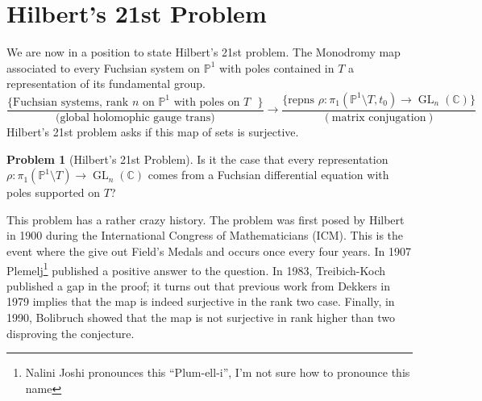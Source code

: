 \documentclass[12pt]{book}
\numberwithin{equation}{section}
\theoremstyle{definition}
\newtheorem{problem}[theorem]{Problem}
\theoremstyle{remark}
\newcommand{\CC}{\mathbb{C}}
\newcommand{\PP}{\mathbb{P}}
\newcommand{\GL}{\operatorname{GL}}
\begin{document}
\section{Hilbert's 21st Problem}
We are now in a position to state Hilbert's 21st problem. 
The Monodromy map associated to every Fuchsian system on $\PP^1$ with poles contained in $T$ a representation of its fundamental group. 
$$ \frac{\lbrace \mbox{Fuchsian systems, rank $n$ on $\PP^1$ 
		with poles on $T$ } \rbrace}{\mbox{(global holomophic gauge trans)}} \to\frac{\lbrace \mbox{repns $\rho:\pi_1(\PP^1\setminus T, t_0) \to \GL_n(\CC) $}\rbrace}{(\mbox{matrix conjugation})} $$
Hilbert's 21st problem asks if this map of sets is surjective. 
\begin{problem}[Hilbert's 21st Problem]
	Is it the case that every representation $\rho:\pi_1(\PP^1\setminus T) \to \GL_n(\CC)$ comes from a Fuchsian differential equation with poles supported on $T$?
\end{problem}
This problem has a rather crazy history. 
The problem was first posed by Hilbert in 1900 during the International Congress of Mathematicians (ICM). 
This is the event where the give out Field's Medals and occurs once every four years. 
In 1907 Plemelj\footnote{Nalini Joshi pronounces this ``Plum-ell-i'', I'm not sure how to pronounce this name} published a positive answer to the question. 
In 1983, Treibich-Koch published a gap in the proof; it turns out that previous work from Dekkers in 1979 implies that the map is indeed surjective in the rank two case. 
Finally, in 1990, Bolibruch showed that the map is not surjective in rank higher than two disproving the conjecture.



\end{document}
